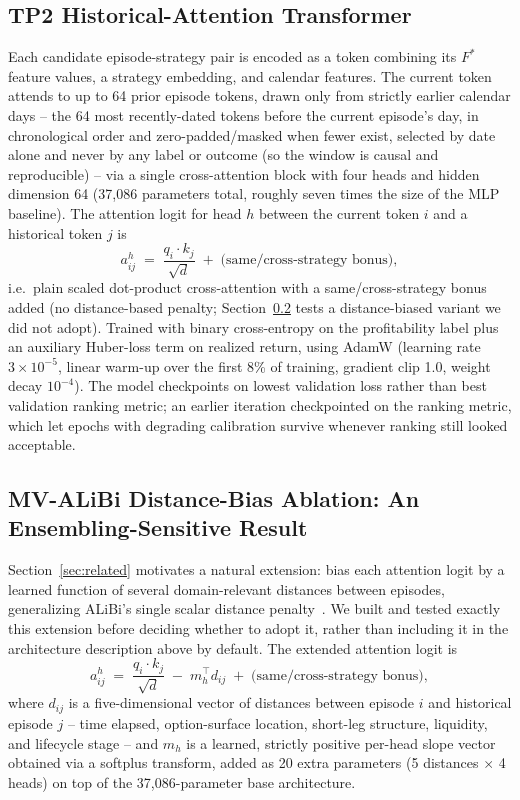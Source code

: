 \documentclass[sigconf,review,anonymous]{acmart}
\begin{document}
\subsection{TP2 Historical-Attention Transformer}
\label{sec:transformer}
Each candidate episode-strategy pair is encoded as a token combining its $F^{\ast}$ feature values, a strategy embedding, and calendar features. The current token attends to up to 64 prior episode tokens, drawn only from strictly earlier calendar days -- the 64 most recently-dated tokens before the current episode's day, in chronological order and zero-padded/masked when fewer exist, selected by date alone and never by any label or outcome (so the window is causal and reproducible) -- via a single cross-attention block with four heads and hidden dimension 64 (37{,}086 parameters total, roughly seven times the size of the MLP baseline). The attention logit for head $h$ between the current token $i$ and a historical token $j$ is
\[
a_{ij}^{h} \;=\; \frac{q_i \cdot k_j}{\sqrt{d}} \;+\; \text{(same/cross-strategy bonus)},
\]
i.e.\ plain scaled dot-product cross-attention with a same/cross-strategy bonus added (no distance-based penalty; Section~\ref{sec:mvalibi-ablation} tests a distance-biased variant we did not adopt). Trained with binary cross-entropy on the profitability label plus an auxiliary Huber-loss term on realized return, using AdamW (learning rate $3\times10^{-5}$, linear warm-up over the first 8\% of training, gradient clip 1.0, weight decay $10^{-4}$). The model checkpoints on lowest validation loss rather than best validation ranking metric; an earlier iteration checkpointed on the ranking metric, which let epochs with degrading calibration survive whenever ranking still looked acceptable.

\subsection{MV-ALiBi Distance-Bias Ablation: An Ensembling-Sensitive Result}
\label{sec:mvalibi-ablation}
Section~\ref{sec:related} motivates a natural extension: bias each attention logit by a learned function of several domain-relevant distances between episodes, generalizing ALiBi's single scalar distance penalty~\cite{press2022alibi}. We built and tested exactly this extension before deciding whether to adopt it, rather than including it in the architecture description above by default. The extended attention logit is
\[
a_{ij}^{h} \;=\; \frac{q_i \cdot k_j}{\sqrt{d}} \;-\; m_h^{\top} d_{ij} \;+\; \text{(same/cross-strategy bonus)},
\]
where $d_{ij}$ is a five-dimensional vector of distances between episode $i$ and historical episode $j$ -- time elapsed, option-surface location, short-leg structure, liquidity, and lifecycle stage -- and $m_h$ is a learned, strictly positive per-head slope vector obtained via a softplus transform, added as 20 extra parameters (5 distances $\times$ 4 heads) on top of the 37{,}086-parameter base architecture.
\end{document}
